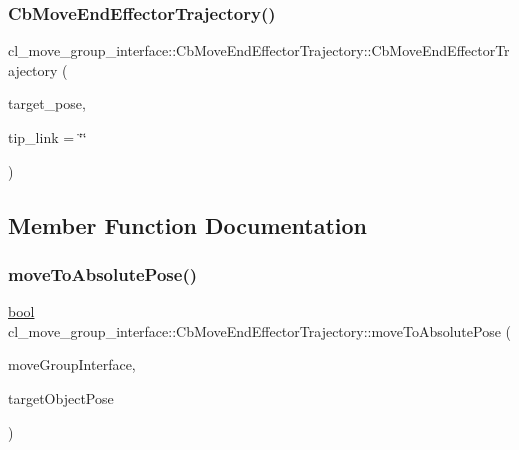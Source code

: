\subsubsection{\texorpdfstring{Cb\+Move\+End\+Effector\+Trajectory()}{CbMoveEndEffectorTrajectory()}\hspace{0.1cm}{\footnotesize\ttfamily [2/2]}}
{\footnotesize\ttfamily cl\+\_\+move\+\_\+group\+\_\+interface\+::\+Cb\+Move\+End\+Effector\+Trajectory\+::\+Cb\+Move\+End\+Effector\+Trajectory (\begin{DoxyParamCaption}\item[{geometry\+\_\+msgs\+::\+Pose\+Stamped}]{target\+\_\+pose,  }\item[{std\+::string}]{tip\+\_\+link = {\ttfamily \char`\"{}\char`\"{}} }\end{DoxyParamCaption})}



\subsection{Member Function Documentation}
\mbox{\label{classcl__move__group__interface_1_1CbMoveEndEffectorTrajectory_a7fabd5f9c44b5a6c602ebee1f9aa4463}} 
\subsubsection{\texorpdfstring{move\+To\+Absolute\+Pose()}{moveToAbsolutePose()}}
{\footnotesize\ttfamily \hyperlink{classbool}{bool} cl\+\_\+move\+\_\+group\+\_\+interface\+::\+Cb\+Move\+End\+Effector\+Trajectory\+::move\+To\+Absolute\+Pose (\begin{DoxyParamCaption}\item[{moveit\+::planning\+\_\+interface\+::\+Move\+Group\+Interface \&}]{move\+Group\+Interface,  }\item[{geometry\+\_\+msgs\+::\+Pose\+Stamped \&}]{target\+Object\+Pose }\end{DoxyParamCaption})\hspace{0.3cm}{\ttfamily [protected]}}

